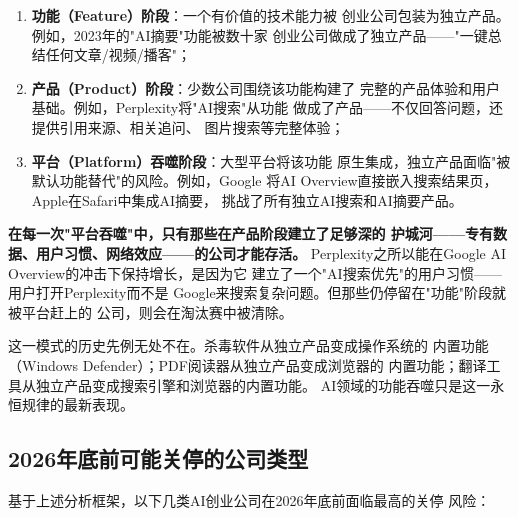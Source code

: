 \begin{enumerate}
  \item \textbf{功能（Feature）阶段}：一个有价值的技术能力被
    创业公司包装为独立产品。例如，2023年的"AI摘要"功能被数十家
    创业公司做成了独立产品——"一键总结任何文章/视频/播客"；
  \item \textbf{产品（Product）阶段}：少数公司围绕该功能构建了
    完整的产品体验和用户基础。例如，Perplexity将"AI搜索"从功能
    做成了产品——不仅回答问题，还提供引用来源、相关追问、
    图片搜索等完整体验；
  \item \textbf{平台（Platform）吞噬阶段}：大型平台将该功能
    原生集成，独立产品面临"被默认功能替代"的风险。例如，Google
    将AI Overview直接嵌入搜索结果页，Apple在Safari中集成AI摘要，
    挑战了所有独立AI搜索和AI摘要产品。
\end{enumerate}

\textbf{在每一次"平台吞噬"中，只有那些在产品阶段建立了足够深的
护城河——专有数据、用户习惯、网络效应——的公司才能存活。}
Perplexity之所以能在Google AI Overview的冲击下保持增长，是因为它
建立了一个"AI搜索优先"的用户习惯——用户打开Perplexity而不是
Google来搜索复杂问题。但那些仍停留在"功能"阶段就被平台赶上的
公司，则会在淘汰赛中被清除。

这一模式的历史先例无处不在。杀毒软件从独立产品变成操作系统的
内置功能（Windows Defender）；PDF阅读器从独立产品变成浏览器的
内置功能；翻译工具从独立产品变成搜索引擎和浏览器的内置功能。
AI领域的功能吞噬只是这一永恒规律的最新表现。


\subsection{2026年底前可能关停的公司类型}
\label{subsec:outlook-shutdown-types}

基于上述分析框架，以下几类AI创业公司在2026年底前面临最高的关停
风险：

